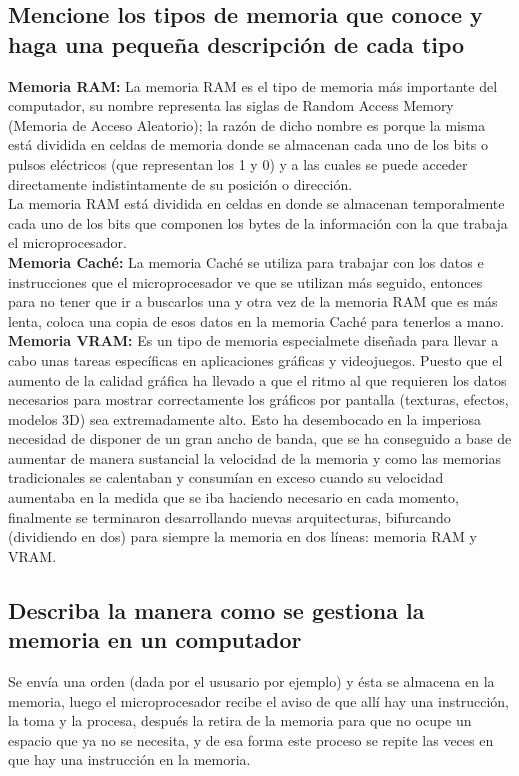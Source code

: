 \documentclass{article}
\begin{document}
\subsection{Mencione los tipos de memoria que conoce y haga una pequeña descripción de cada tipo} \label{contenido}
\textbf{Memoria RAM:}
La memoria RAM es el tipo de memoria más importante del computador, su nombre representa las siglas de Random Access Memory (Memoria de Acceso Aleatorio); la razón de dicho nombre es porque la misma está dividida en celdas de memoria donde se almacenan cada uno de los bits o pulsos eléctricos (que representan los 1 y 0) y a las cuales se puede acceder directamente indistintamente de su posición o dirección.\\
La memoria RAM está dividida en celdas en donde se almacenan temporalmente cada uno de los bits que componen los bytes de la información con la que trabaja el microprocesador.
\cite{memoria}\\
\textbf{Memoria Caché:} La memoria Caché se utiliza para trabajar con los datos e instrucciones que el microprocesador ve que se utilizan más seguido, entonces para no tener que ir a buscarlos una y otra vez de la memoria RAM que es más lenta, coloca una copia de esos datos en la memoria Caché para tenerlos a mano.
\cite{memoria}\\
\textbf{Memoria VRAM:} Es un tipo de memoria especialmete diseñada para llevar a cabo unas tareas específicas en aplicaciones gráficas y videojuegos. Puesto que el aumento de la calidad gráfica ha llevado a que el ritmo al que requieren los datos necesarios para mostrar correctamente los gráficos por pantalla (texturas, efectos, modelos 3D) sea extremadamente alto. Esto ha desembocado en la imperiosa necesidad de disponer de un gran ancho de banda, que se ha conseguido a base de aumentar de manera sustancial la velocidad de la memoria y  como las memorias tradicionales se calentaban y consumían en exceso cuando su velocidad aumentaba en la medida que se iba haciendo necesario en cada momento, finalmente se terminaron desarrollando nuevas arquitecturas, bifurcando (dividiendo en dos) para siempre la memoria en dos líneas: memoria RAM y VRAM.
\cite{vram}
\subsection{Describa la manera como se gestiona la memoria en un computador}
Se envía una orden (dada por el ususario por ejemplo) y ésta se almacena en la memoria, luego el microprocesador recibe el aviso de que allí hay una instrucción, la toma y la procesa, después la retira de la memoria para que no ocupe un espacio que ya no se necesita, y de esa forma este proceso se repite las veces en que hay una instrucción en la memoria.
\cite{memoria}
\end{document}
